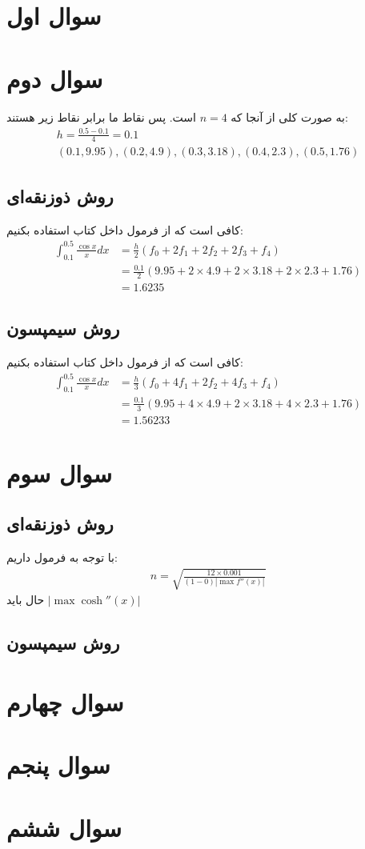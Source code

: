 \documentclass[]{article}
\begin{document}
\printheader

\section*{سوال اول}

\section*{سوال دوم}
به صورت کلی از آنجا که
$n = 4$
است. پس نقاط ما برابر نقاط زیر هستند:
\begin{gather*}
    h = \frac{0.5 - 0.1}{4} = 0.1\\
    (0.1, 9.95), (0.2, 4.9), (0.3, 3.18), (0.4, 2.3), (0.5, 1.76)
\end{gather*}
\subsection*{روش ذوزنقه‌ای}
کافی است که از فرمول داخل کتاب استفاده بکنیم:
\begin{align*}
    \int_{0.1}^{0.5} \frac{\cos x}{x} dx &= \frac{h}{2} (f_0 + 2f_1 + 2f_2 + 2f_3 + f_4)\\
    &= \frac{0.1}{2} (9.95 + 2 \times 4.9 + 2 \times 3.18 + 2 \times 2.3 + 1.76)\\
    &= \boxed{1.6235}
\end{align*}
\subsection*{روش سیمپسون}
کافی است که از فرمول داخل کتاب استفاده بکنیم:
\begin{align*}
    \int_{0.1}^{0.5} \frac{\cos x}{x} dx &= \frac{h}{3} (f_0 + 4f_1 + 2f_2 + 4f_3 + f_4)\\
    &= \frac{0.1}{3} (9.95 + 4 \times 4.9 + 2 \times 3.18 + 4 \times 2.3 + 1.76)\\
    &= \boxed{1.56233}
\end{align*}
\section*{سوال سوم}
\subsection*{روش ذوزنقه‌ای}
با توجه به فرمول داریم:
\begin{gather*}
    n = \sqrt{\frac{12 \times 0.001}{(1 - 0) |\max f''(x)|}}
\end{gather*}
حال باید
$|\max \operatorname{cosh}''(x)|$
\subsection*{روش سیمپسون}
\section*{سوال چهارم}
\section*{سوال پنجم}
\section*{سوال ششم}
\end{document}
